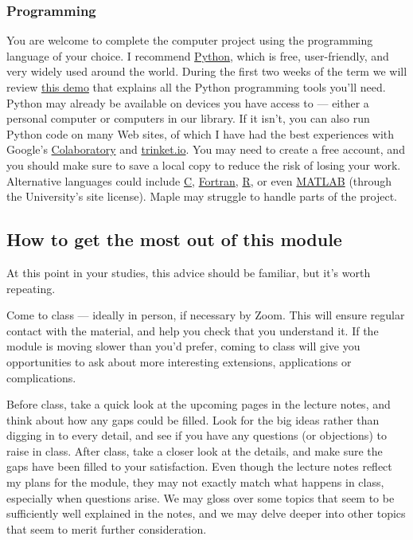 \subsubsection*{Programming}
You are welcome to complete the computer project using the programming language of your choice.
I recommend \href{https://www.python.org}{Python}, which is free, user-friendly, and very widely used around the world.
During the first two weeks of the term we will review \href{https://tinyurl.com/math327demo}{this demo} that explains all the Python programming tools you'll need.
Python may already be available on devices you have access to --- either a personal computer or computers in our library.
If it isn't, you can also run Python code on many Web sites, of which I have had the best experiences with Google's \href{https://colab.research.google.com}{Colaboratory}
and \href{https://trinket.io/python3}{trinket.io}. %
You may need to create a free account, and you should make sure to save a local copy to reduce the risk of losing your work.
Alternative languages could include \href{https://en.wikipedia.org/wiki/C_(programming_language)}{C}, \href{https://fortran-lang.org}{Fortran}, \href{https://www.r-project.org}{R}, or even \href{https://matlab.mathworks.com}{MATLAB} (through the University's site license).
Maple may struggle to handle parts of the project.



\subsection*{How to get the most out of this module}
At this point in your studies, this advice should be familiar, but it's worth repeating.

Come to class --- ideally in person, if necessary by Zoom.
This will ensure regular contact with the material, and help you check that you understand it.
If the module is moving slower than you'd prefer, coming to class will give you opportunities to ask about more interesting extensions, applications or complications.

Before class, take a quick look at the upcoming pages in the lecture notes, and think about how any gaps could be filled.
Look for the big ideas rather than digging in to every detail, and see if you have any questions (or objections) to raise in class.
After class, take a closer look at the details, and make sure the gaps have been filled to your satisfaction.
Even though the lecture notes reflect my plans for the module, they may not exactly match what happens in class, especially when questions arise.
We may gloss over some topics that seem to be sufficiently well explained in the notes, and we may delve deeper into other topics that seem to merit further consideration.

